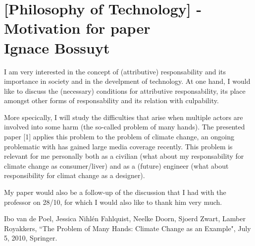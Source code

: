 \documentclass[../main/main.tex]{subfiles}
\begin{document}
\section{[Philosophy of Technology] - Motivation for paper \\ Ignace Bossuyt}

I am very interested in the concept of (attributive) responsability and its importance in society and in the develpment of technology. At one hand, I would like to discuss the (necessary) conditions for attributive responsability, its place amongst other forms of responsability and its relation with culpability.

More specically, I will study the difficulties that arise when multiple actors are involved into some harm (the so-called problem of many hands). The presented paper [1] applies this problem to the problem of climate change, an ongoing problematic with has gained large media coverage recently. This problem is relevant for me personally both as a civilian (what about my responsability for climate change as consumer/liver) and as a (future) engineer (what about responsibility for climat change as a designer).

My paper would also be a follow-up of the discussion that I had with the professor on 28/10, for which I would also like to thank him very much.

\begin{thebibliography}{12}  
 Ibo van de Poel, Jessica Nihlén Fahlquist, Neelke Doorn, Sjoerd Zwart, Lamber Royakkers, ``The Problem of Many Hands: Climate Change as an Example", July 5, 2010, Springer.

\end{thebibliography}
\end{document}
